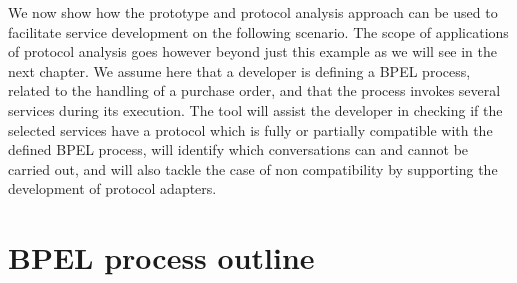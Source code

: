 
We now show how the prototype and protocol analysis approach can be used to facilitate service development on the following scenario. The scope of applications of protocol analysis goes however beyond just this example as we will see in the next chapter.
%
We assume here that a developer is defining a BPEL process, related to the handling of a purchase order, and that the process invokes several services during its execution. The tool will assist the developer in checking if the selected services have a protocol which is fully or partially compatible with the defined BPEL process, will identify which conversations can and cannot be carried out, and will also tackle the case of non compatibility by supporting the development of protocol adapters.


\section{BPEL process outline}


